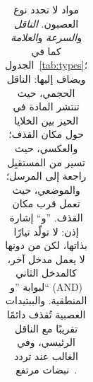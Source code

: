 \begin{table}[t]
\begin{tabular}{>{\raggedright}p{2.25cm}>{\raggedright}p{2.8cm}>{\raggedright}p{1.8cm}>{\raggedright}p{1.5cm}>{\centering}p{0.8cm}>{\raggedright\arraybackslash}p{4.3cm}}
\bottomrule
\end{tabular}
\caption{مواد لا تحدد نوع العصبون. \emph{الناقل} و\emph{السرعة} و\emph{العلامة} كما في الجدول~\ref{tab:types}؛ ويضاف إليها: الناقل الحجمي، حيث تنتشر المادة في الحيز بين الخلايا حول مكان القذف؛ والعكسي، حيث تسير من المستقبِل راجعة إلى المرسل؛ والموضعي، حيث تعمل قرب مكان القذف. ”و“ إشارة إذن: لا تولّد تيارًا بذاتها، لكن من دونها لا يعمل مدخل آخر، كالمدخل الثاني لبوابة ”و“ (\foreignlanguage{english}{AND}) المنطقية. والببتيدات العصبية تُقذف دائمًا تقريبًا مع الناقل الرئيسي، وفي الغالب عند تردد نبضات مرتفع~\cite{vandenPol2012}.}
\label{tab:othermediators}
\end{table}
